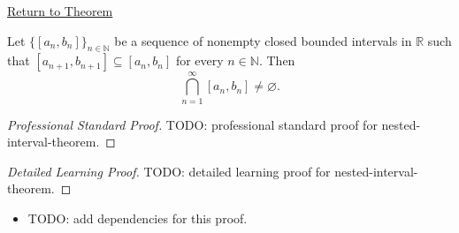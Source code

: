\newpage
{}
\label{prf:nested-interval-theorem}

\begin{remark*}[Return]
\hyperref[thm:nested-interval-theorem]{Return to Theorem}
\end{remark*}

\begin{theorem*}
Let $\{[a_n,b_n]\}_{n\in\mathbb N}$ be a sequence of nonempty closed bounded
intervals in $\mathbb R$ such that $[a_{n+1},b_{n+1}]\subseteq [a_n,b_n]$
for every $n\in\mathbb N$. Then
\[
  \bigcap_{n=1}^{\infty}[a_n,b_n]\neq\varnothing.
\]
\end{theorem*}

\begin{proof}[Professional Standard Proof]
\LRAProofBodyStart
TODO: professional standard proof for nested-interval-theorem.
\end{proof}

\begin{proof}[Detailed Learning Proof]
\LRAProofBodyStart
TODO: detailed learning proof for nested-interval-theorem.
\end{proof}

\begin{remark*}
\end{remark*}

\begin{dependencies}
\begin{itemize}
  \item TODO: add dependencies for this proof.
\end{itemize}
\end{dependencies}

\clearpage
